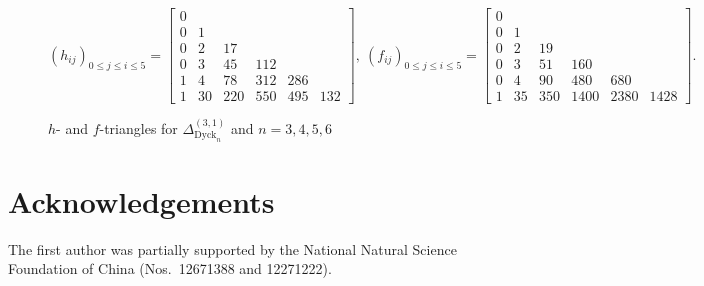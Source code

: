 \documentclass[11pt]{amsart}
\def\Dyck{\mathrm{Dyck}}
\theoremstyle{plain}
\numberwithin{lemma}{\DefaultNumberTheoremWithin}
\numberwithin{theorem}{\DefaultNumberTheoremWithin}
\numberwithin{corollary}{\DefaultNumberTheoremWithin}
\numberwithin{proposition}{\DefaultNumberTheoremWithin}
\numberwithin{conjecture}{\DefaultNumberTheoremWithin}
\theoremstyle{definition}
\numberwithin{definition}{\DefaultNumberTheoremWithin}
\numberwithin{question}{\DefaultNumberTheoremWithin}
\numberwithin{problem}{\DefaultNumberTheoremWithin}
\theoremstyle{remark}
\numberwithin{remark}{\DefaultNumberTheoremWithin}
\numberwithin{example}{\DefaultNumberTheoremWithin}
\numberwithin{claim}{\DefaultNumberTheoremWithin}
\begin{document}
\begin{figure}[H]
{$$ (h_{ij})_{0 \leq j \leq i \leq 5} = \left[\begin{array}{cccccc}
 0 &    &   &     & & \\
  0 & 1  &  &     & &\\
  0& 2  & 17 &    & & \\
  0 & 3 & 45 & 112 & & \\
  1 & 4 & 78 & 312 & 286 & \\
  1 & 30 & 220 & 550 & 495 & 132 
  \end{array}\right],\
(f_{ij})_{0 \leq j \leq i \leq 5} = \left[
 \begin{array}{ccccccc}
  0 &    &   &  & & \\
  0 & 1  &   &  & & \\
  0 & 2  & 19 & & & \\
  0& 3 & 51 & 160 &  & \\
  0 & 4 & 90 & 480 & 680 & \\
  1 & 35 & 350 & 1400 & 2380 & 1428 
  \end{array}\right].$$
  }
  \caption{$h$- and $f$-triangles for $\Delta^{(3,1)}_{\Dyck_n}$ and $n=3,4,5,6$}\label{figfc3}
  \end{figure}

\section*{Acknowledgements}
The first author was partially supported by the National Natural Science Foundation of China (Nos.\ 12671388 and 12271222).



\end{document}
